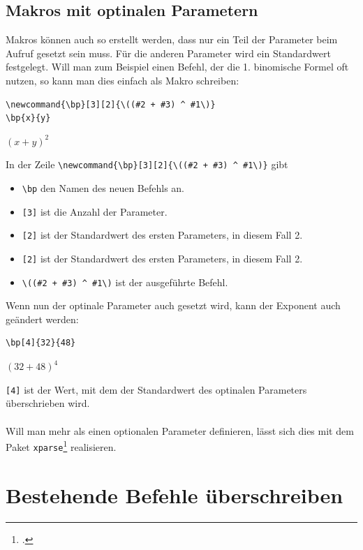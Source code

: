 \documentclass[ngerman,12pt,titlepage]{scrartcl}
\newenvironment{hlbox}{\begin{tcolorbox}[enhanced,colback=white,colframe=white,sharpish corners,fuzzy halo=0.5mm with lightgray]}{\end{tcolorbox}}
\begin{document}
\subsection{Makros mit optinalen Parametern}
\label{ssec:MakMOptPara}
\newcommand{\bp}[3][2]{\((#2 + #3) ^ #1\)}
Makros können auch so erstellt werden, dass nur ein Teil der Parameter beim Aufruf gesetzt sein muss. Für die anderen Parameter wird ein Standardwert festgelegt. 
Will man zum Beispiel einen Befehl, der die 1. binomische Formel oft nutzen, so kann man dies einfach als Makro schreiben:
\newpage
\begin{lstlisting}[caption = binomisch Plus]
\newcommand{\bp}[3][2]{\((#2 + #3) ^ #1\)}
\bp{x}{y}
\end{lstlisting}
\begin{hlbox}
\bp{x}{y}
\end{hlbox}
In der Zeile \lstinline|\newcommand{\bp}[3][2]{\((#2 + #3) ^ #1\)}| gibt
\begin{itemize}
\item[] \lstinline|\bp| den Namen des neuen Befehls an. 
\item[] \lstinline|[3]| ist die Anzahl der Parameter. 
\item[] \lstinline|[2]| ist der Standardwert des ersten Parameters, in diesem Fall 2. 
\item[] \lstinline|[2]| ist der Standardwert des ersten Parameters, in diesem Fall 2. 
\item[] \lstinline|\((#2 + #3) ^ #1\)| ist der ausgeführte Befehl.
\end{itemize}
Wenn nun der optinale Parameter auch gesetzt wird, kann der Exponent auch geändert werden:
\begin{lstlisting}[caption = binomisch Plus hoch 4]
\bp[4]{32}{48}
\end{lstlisting}
\begin{hlbox}
\bp[4]{32}{48}
\end{hlbox}
\lstinline|[4]| ist der Wert, mit dem der Standardwert des optinalen Parameters überschrieben wird. \\ \\
Will man mehr als einen optionalen Parameter definieren, lässt sich dies mit dem Paket \texttt{xparse}\footcite{so:xparse} realisieren.
\newpage

\section{Bestehende Befehle überschreiben}
\label{sec:Ueberschreiben}
\end{document}
